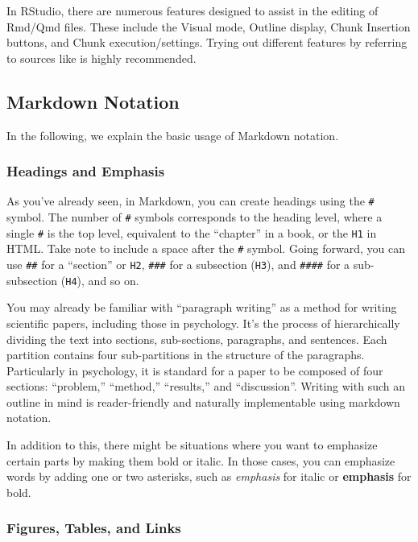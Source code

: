 \documentclass[
  a4paper,
]{book}
\begin{document}
In RStudio, there are numerous features designed to assist in the
editing of Rmd/Qmd files. These include the Visual mode, Outline
display, Chunk Insertion buttons, and Chunk execution/settings. Trying
out different features by referring to sources like
\textcite{Takahashi201805} is highly recommended.

\subsection{Markdown Notation}\label{markdown-notation}

In the following, we explain the basic usage of Markdown notation.

\subsubsection{Headings and Emphasis}\label{headings-and-emphasis}

As you've already seen, in Markdown, you can create headings using the
\texttt{\#} symbol. The number of \texttt{\#} symbols corresponds to the
heading level, where a single \texttt{\#} is the top level, equivalent
to the ``chapter'' in a book, or the \texttt{H1} in HTML. Take note to
include a space after the \texttt{\#} symbol. Going forward, you can use
\texttt{\#\#} for a ``section'' or \texttt{H2}, \texttt{\#\#\#} for a
subsection (\texttt{H3}), and \texttt{\#\#\#\#} for a sub-subsection
(\texttt{H4}), and so on.

You may already be familiar with ``paragraph writing'' as a method for
writing scientific papers, including those in psychology. It's the
process of hierarchically dividing the text into sections, sub-sections,
paragraphs, and sentences. Each partition contains four sub-partitions
in the structure of the paragraphs. Particularly in psychology, it is
standard for a paper to be composed of four sections: ``problem,''
``method,'' ``results,'' and ``discussion''. Writing with such an
outline in mind is reader-friendly and naturally implementable using
markdown notation.

In addition to this, there might be situations where you want to
emphasize certain parts by making them bold or italic. In those cases,
you can emphasize words by adding one or two asterisks, such as
\emph{emphasis} for italic or \textbf{emphasis} for bold.

\subsubsection{Figures, Tables, and
Links}\label{figures-tables-and-links}
\end{document}

